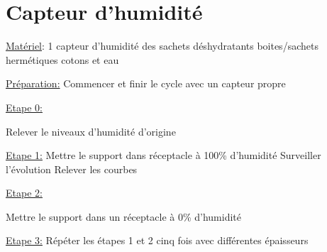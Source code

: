 \newpage

\section{Capteur d'humidité} 

\noindent \underline{Matériel}: 
1 capteur d'humidité des sachets déshydratants boites/sachets hermétiques cotons et eau \newline 

\noindent \underline{Préparation:} \newline  
Commencer et finir le cycle avec un capteur propre\newline  

\noindent \underline{Etape 0:}  

\noindent Relever le niveaux d'humidité d'origine  

\noindent \underline{Etape 1:} \newline  
Mettre le support dans réceptacle à 100\% d'humidité\newline  
Surveiller l'évolution\newline  
Relever les courbes

\noindent \underline{Etape 2:} 

\noindent Mettre le support dans un réceptacle à 0\% d'humidité 

\noindent \underline{Etape 3:}  \newline
Répéter les  étapes 1 et 2 cinq fois avec différentes épaisseurs
